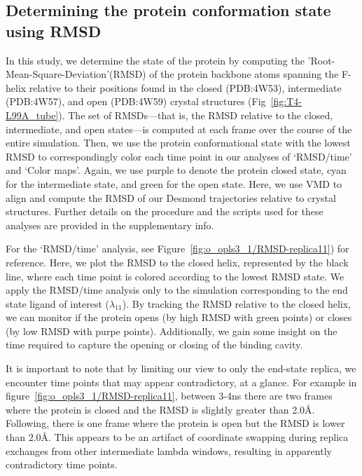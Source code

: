 \documentclass[journal=jctcce,manuscript=article]{achemso}
\begin{document}
\subsection*{Determining the protein conformation state using RMSD}
In this study, we determine the state of the protein by computing the 'Root-Mean-Square-Deviation'(RMSD) of the protein backbone atoms spanning the F-helix relative to their positions found in the closed (PDB:4W53), intermediate (PDB:4W57), and open (PDB:4W59) crystal structures (Fig~\ref{fig:T4-L99A_tube}).
The set of RMSDs---that is, the RMSD relative to the closed, intermediate, and open states---is computed at each frame over the course of the entire simulation. 
Then, we use the protein conformational state with the lowest RMSD to correspondingly color each time point in our analyses of `RMSD/time' and `Color maps'.
Again, we use purple to denote the protein closed state, cyan for the intermediate state, and green for the open state.
Here, we use VMD \cite{VMDpaper,VMDalignment} to align and compute the RMSD of our Desmond trajectories relative to crystal structures.
Further details on the procedure and the scripts used for these analyses are provided in the supplementary info.

For the `RMSD/time' analysis, see Figure~\ref{fig:o_opls3_1/RMSD-replica11}) for reference. 
Here, we plot the RMSD to the closed helix, represented by the black line, where each time point is colored according to the lowest RMSD state.
We apply the RMSD/time analysis only to the simulation corresponding to the end state ligand of interest ($\lambda_{11}$).
By tracking the RMSD relative to the closed helix, we can monitor if the protein opens (by high RMSD with green points) or closes (by low RMSD with purpe points).
Additionally, we gain some insight on the time required to capture the opening or closing of the binding cavity.

It is important to note that by limiting our view to only the end-state replica, we encounter time points that may appear contradictory, at a glance. 
For example in figure~\ref{fig:o_opls3_1/RMSD-replica11}, between 3-4ns there are two frames where the protein is closed and the RMSD is slightly greater than 2.0\AA.
Following, there is one frame where the protein is open but the RMSD is lower than 2.0\AA.
This appears to be an artifact of coordinate swapping during replica exchanges from other intermediate lambda windows, resulting in apparently contradictory time points.
\end{document}
